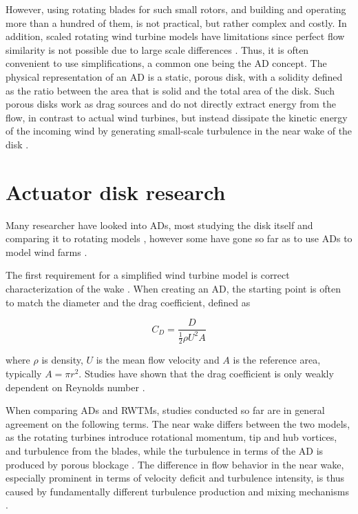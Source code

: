 However, using rotating blades for such small rotors, and building and operating more than a hundred of them, is not practical, but rather complex and costly. In addition, scaled rotating wind turbine models have limitations since perfect flow similarity is not possible due to large scale differences \cite{Bossuyt2016}. Thus, it is often convenient to use simplifications, a common one being the \gls{AD} concept. The physical representation of an \gls{AD} is a static, porous disk, with a solidity defined as the ratio between the area that is solid and the total area of the disk. Such porous disks work as drag sources and do not directly extract energy from the flow, in contrast to actual wind turbines, but instead dissipate the kinetic energy of the incoming wind by generating small-scale turbulence in the near wake of the disk \cite{Lignarolo2016}. 





\section{Actuator disk research}

Many researcher have looked into \gls{AD}s, most studying the disk itself and comparing it to rotating models \cite{Neunaber, Aubrun2019, Sforza1981, Lignarolo2014, Blackmore2013, Pierella2010, Cannon1993, Aubrun2013}, however some have gone so far as to use \gls{AD}s to model wind farms \cite{Bossuyt2016, Theunissen2014, Theunissen2019}. 

The first requirement for a simplified wind turbine model is correct characterization of the wake \cite{Theunissen2014}. When creating an \gls{AD}, the starting point is often to match the diameter and the drag coefficient, defined as

\begin{equation}
    C_D = \frac{D}{\frac{1}{2} \rho U^2 A}
    \label{Eq:Cd}
\end{equation}

where $\rho$ is density, $U$ is the mean flow velocity and $A$ is the reference area, typically $A = \pi r^2$. Studies have shown that the drag coefficient is only weakly dependent on Reynolds number \cite{Blackmore2013}. 

When comparing \gls{AD}s and \glspl{RWTM}, studies conducted so far are in general agreement on the following terms. The near wake differs between the two models, as the rotating turbines introduce rotational momentum, tip and hub vortices, and turbulence from the blades, while the turbulence in terms of the \gls{AD} is produced by porous blockage \cite{Lignarolo2014, Zhang2012, Barthelmie2009}. The difference in flow behavior in the near wake, especially prominent in terms of velocity deficit and turbulence intensity, is thus caused by fundamentally different turbulence production and mixing mechanisms \cite{Aubrun2019, Lignarolo2016, Barthelmie2010}.

